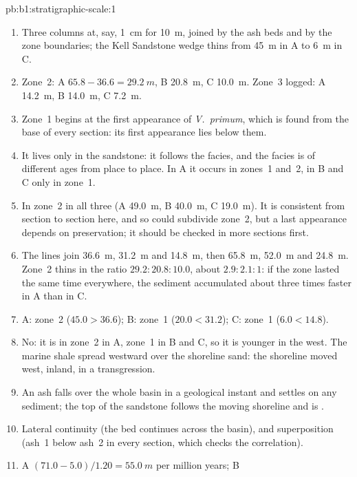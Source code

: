 \begin{solution}{pb:b1:stratigraphic-scale:1}
\begin{enumerate}
  \item Three columns at, say, \qty{1}{cm} for \qty{10}{m}, joined by the ash
        beds and by the zone boundaries; the Kell Sandstone wedge thins from
        \qty{45}{m} in A to \qty{6}{m} in C.
  \item Zone~2: A $65.8 - 36.6 = \qty{29.2}{m}$, B \qty{20.8}{m}, C
        \qty{10.0}{m}. Zone~3 logged: A \qty{14.2}{m}, B \qty{14.0}{m}, C
        \qty{7.2}{m}.
  \item Zone~1 begins at the first appearance of \emph{V.~primum}, which is found
        from the base of every section: its first appearance lies below them.
  \item It lives only in the sandstone: it follows the facies, and the facies
        is of different ages from place to place. In A it occurs in zones~1
        and~2, in B and C only in zone~1.
  \item In zone~2 in all three (A \qty{49.0}{m}, B \qty{40.0}{m}, C
        \qty{19.0}{m}). It is consistent from section to section here, and so
        could subdivide zone~2, but a last appearance depends on preservation;
        it should be checked in more sections first.
  \item The lines join \qty{36.6}{m}, \qty{31.2}{m} and \qty{14.8}{m}, then
        \qty{65.8}{m}, \qty{52.0}{m} and \qty{24.8}{m}. Zone~2 thins in the
        ratio $29.2 : 20.8 : 10.0$, about $2.9 : 2.1 : 1$: if the zone lasted
        the same time everywhere, the sediment accumulated about three times
        faster in A than in C.
  \item A: zone~2 ($45.0 > 36.6$); B: zone~1 ($20.0 < 31.2$); C: zone~1
        ($6.0 < 14.8$).
  \item No: it is in zone~2 in A, zone~1 in B and C, so it is younger in the
        west. The marine shale spread westward over the shoreline sand: the
        shoreline moved west, inland, in a transgression.
  \item An ash falls over the whole basin in a geological instant and settles
        on any sediment; the top of the sandstone follows the moving shoreline
        and is .
  \item Lateral continuity (the bed continues across the basin), and
        superposition (ash~1 below ash~2 in every section, which checks the
        correlation).
  \item A $(71.0 - 5.0)/1.20 = \qty{55.0}{m}$ per million years; B

\end{enumerate}
\end{solution}
